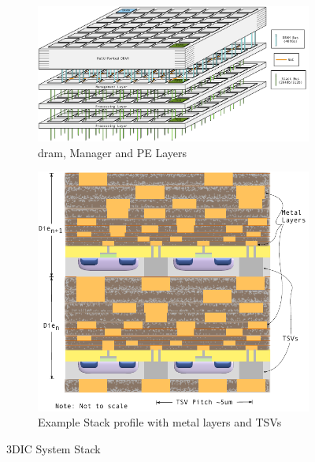 \documentclass[journal]{IEEEtran}
\begin{document}
\begin{figure}
\centering
\begin{subfigure}{.5\textwidth}
  \centering
  \includegraphics[width=1\textwidth]{StackDiagram.jpg}
  \captionsetup{justification=centering, width=.8\linewidth}
  \caption{\ac{dram}, Manager and PE Layers}
  \label{fig:3DICStack}
\end{subfigure}%

\bigskip

\begin{subfigure}{.35\textwidth}
  \centering
  \includegraphics[width=1\textwidth]{TSVs.pdf}
  \captionsetup{justification=centering, width=1\linewidth}
  \caption{Example Stack profile with metal layers and TSVs \cite{itrs2015_interconn}}
  \label{fig:tsv}
\end{subfigure}
\captionsetup{justification=centering, width=.9\linewidth}
\caption{3DIC System Stack}
\label{fig:3DICStack}
\end{figure}
\end{document}
